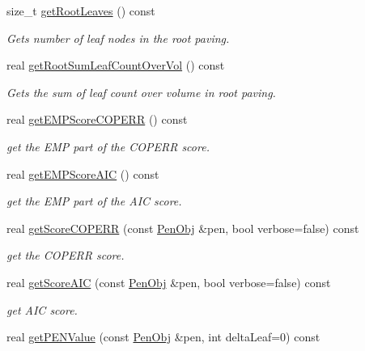 \begin{DoxyCompactItemize}
size\-\_\-t \hyperlink{classsubpavings_1_1AdaptiveHistogram_ae4a71d928009eda0a6332f20fd951e35}{get\-Root\-Leaves} () const 
\begin{DoxyCompactList}\small\item\em \-Gets number of leaf nodes in the root paving. \end{DoxyCompactList}\item 
real \hyperlink{classsubpavings_1_1AdaptiveHistogram_ac7f7cb4d5aea17c967afec84e1159f9b}{get\-Root\-Sum\-Leaf\-Count\-Over\-Vol} () const 
\begin{DoxyCompactList}\small\item\em \-Gets the sum of leaf count over volume in root paving. \end{DoxyCompactList}\item 
real \hyperlink{classsubpavings_1_1AdaptiveHistogram_afb0bda49b3a39ab8aa53737de810afec}{get\-E\-M\-P\-Score\-C\-O\-P\-E\-R\-R} () const 
\begin{DoxyCompactList}\small\item\em get the \-E\-M\-P part of the \-C\-O\-P\-E\-R\-R score. \end{DoxyCompactList}\item 
real \hyperlink{classsubpavings_1_1AdaptiveHistogram_a71b9bb96936f8e5f6a298c6d1a382e0b}{get\-E\-M\-P\-Score\-A\-I\-C} () const 
\begin{DoxyCompactList}\small\item\em get the \-E\-M\-P part of the \-A\-I\-C score. \end{DoxyCompactList}\item 
real \hyperlink{classsubpavings_1_1AdaptiveHistogram_a94e90e67d767c5e0ad7b4378e0a72cad}{get\-Score\-C\-O\-P\-E\-R\-R} (const \hyperlink{classsubpavings_1_1PenObj}{\-Pen\-Obj} \&pen, bool verbose=false) const 
\begin{DoxyCompactList}\small\item\em get the \-C\-O\-P\-E\-R\-R score. \end{DoxyCompactList}\item 
real \hyperlink{classsubpavings_1_1AdaptiveHistogram_a8333360139bee06eb9c661b8a47cb4a3}{get\-Score\-A\-I\-C} (const \hyperlink{classsubpavings_1_1PenObj}{\-Pen\-Obj} \&pen, bool verbose=false) const 
\begin{DoxyCompactList}\small\item\em get \-A\-I\-C score. \end{DoxyCompactList}\item 
real \hyperlink{classsubpavings_1_1AdaptiveHistogram_acb7aa3bb3a7b4d4691e9b5b9c9d4a765}{get\-P\-E\-N\-Value} (const \hyperlink{classsubpavings_1_1PenObj}{\-Pen\-Obj} \&pen, int delta\-Leaf=0) const 

\end{DoxyCompactItemize}
